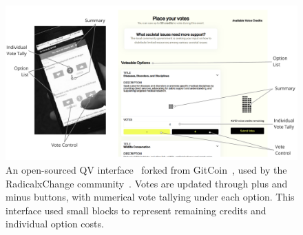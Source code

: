     
    

\begin{figure}[h]
    \centering
    \includegraphics[width=\textwidth]{content/image/curr_interface/recent_annotated.pdf}
    \caption{An open-sourced QV interface~\cite{RadicalxChangeQuadraticvoting2024} forked from GitCoin~\cite{ReadWhitepaperGitcoin}, used by the RadicalxChange community~\cite{RxC}. Votes are updated through plus and minus buttons, with numerical vote tallying under each option. This interface used small blocks to represent remaining credits and individual option costs.}
    \Description{}
    \label{fig:rcx_interface_annotated}
\end{figure}

